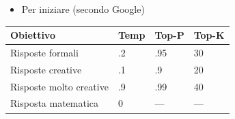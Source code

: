 \begin{frame}[t]
{\begin{minipage}[t]{\textwidth}
\begin{minipage}[t]{0.38\textwidth}
\begin{figure}[ht]
                \end{figure}
            \end{minipage}
	    \end{minipage}
        \begin{itemize}[leftmargin=10pt,align=right]
			\onslide<2->\item[\alert{\faArrowCircleRight}] Per iniziare (secondo Google)               
        \end{itemize}
        \begin{minipage}[t]{0.65\textwidth}
        {\footnotesize
            \begin{table}
            \renewcommand{\arraystretch}{1}
            \centering
            \begin{tabularx}{\textwidth}{llll}
                \toprule
                \textbf{Obiettivo} & \textbf{Temp} & \textbf{Top-P} & \textbf{Top-K}\\
                \midrule
                Risposte formali        & .2 & .95 & 30  \\
                Risposte creative       & .1 & .9  & 20  \\
                Risposte molto creative & .9 & .99 & 40  \\
                Risposta matematica     & 0  & --- & --- \\
                \bottomrule
            \end{tabularx}
            \end{table}
        }
        \end{minipage}
	}
\end{frame}
%
